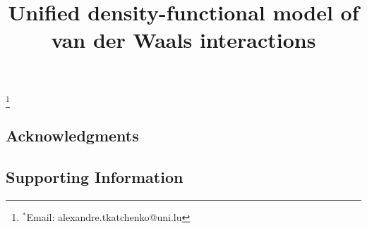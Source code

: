 

\title{Unified density-functional model of van der Waals interactions}




\begingroup
\renewcommand\thefootnote{}\footnote{$^*$Email: alexandre.tkatchenko@uni.lu}%
\addtocounter{footnote}{-1}%
\endgroup



\subsection{Acknowledgments}

\subsection{Supporting Information}

\begingroup
\setlength\bibsep{0pt}
\footnotesize

\endgroup



